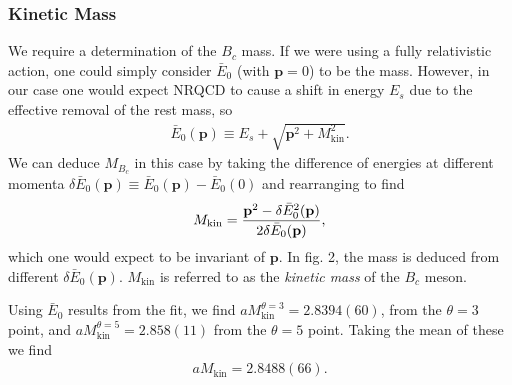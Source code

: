 
\subsubsection{Kinetic Mass}
\label{sec:kinetic_mass}

We require a determination of the $B_c$ mass. If we were using a fully relativistic action, one could simply consider $\bar{E}_0$ (with ${\textbf{p}}=0$) to be the mass. However, in our case one would expect NRQCD to cause a shift in energy $E_s$ due to the effective removal of the rest mass, so
\begin{align}
 \bar{E}_0({\textbf{p}}) \equiv E_s + \sqrt{ {\textbf{p}}^2 + M_{\text{kin}}^2 }.
 \label{eq:euclidean_energy}
\end{align}
We can deduce $M_{B_c}$ in this case by taking the difference of energies at different momenta $\delta \bar{E}_0({\textbf{p}}) \equiv \bar{E}_0({\textbf{p}}) - \bar{E}_0(0)$ and rearranging to find
\begin{align}
 M_{\text{kin}} = { {\textbf{p}}^2 - \delta \bar{E}_0^2({\textbf{p}}) \over 2\delta \bar{E}_0({\textbf{p}}) },
 \label{eq:kinetic_mass}
\end{align}
which one would expect to be invariant of ${\textbf{p}}$. In fig. 2, the mass is deduced from different $\delta \bar{E}_0({\textbf{p}})$. $M_{\text{kin}}$ is referred to as the \textit{kinetic mass} of the $B_c$ meson.

Using $\bar{E}_0$ results from the fit, we find $aM_{\text{kin}}^{\theta=3} = 2.8394(60)$, from the $\theta=3$ point, and $aM_{\text{kin}}^{\theta=5} = 2.858(11)$ from the $\theta=5$ point. Taking the mean of these we find
\begin{align}
  aM_{\text{kin}} = 2.8488(66).
  \label{eq:kineticmass_Bc}
\end{align}

